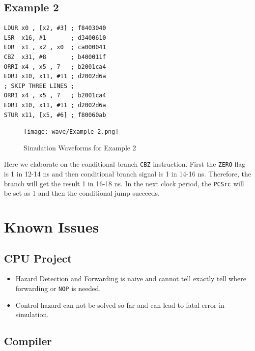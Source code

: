 \documentclass[11pt,fancy,bibstyle=ieee]{elegantbook}
\begin{document}
  \section{Example 2}

      \begin{lstlisting}[language={[x86masm]Assembler}, columns=fixed, morekeywords={LDUR,LSR,EOR,CBZ,ORRI,EORI,STUR}]
LDUR x0 , [x2, #3] ; f8403040
LSR  x16, #1       ; d3400610
EOR  x1 , x2 , x0  ; ca000041
CBZ  x31, #8       ; b400011f
ORRI x4 , x5 , 7   ; b2001ca4
EORI x10, x11, #11 ; d2002d6a
; SKIP THREE LINES ;
ORRI x4 , x5 , 7   ; b2001ca4
EORI x10, x11, #11 ; d2002d6a
STUR x11, [x5, #6] ; f80060ab
    \end{lstlisting}

    \begin{figure}[htbp]
      \centering
      \texttt{[image: wave/Example 2.png]}
      \caption{Simulation Waveforms for Example 2}
      \label{fig:sim_2}
    \end{figure}

    Here we elaborate on the conditional branch \texttt{CBZ} instruction.
    First the \texttt{ZERO} flag is 1 in 12-14 ns and then conditional branch signal is 1 in 14-16 ns.
    Therefore, the branch will get the result 1 in 16-18 ns.
    In the next clock period, the \texttt{PCSrc} will be set as 1 and then the conditional jump succeeds.

\chapter{Known Issues}

    \section{CPU Project}

      \begin{itemize}
        \item Hazard Detection and Forwarding is naive and cannot tell exactly tell where forwarding or \texttt{NOP} is needed.
        \item Control hazard can not be solved so far and can lead to fatal error in simulation.
      \end{itemize}

    \section{Compiler}
\end{document}
